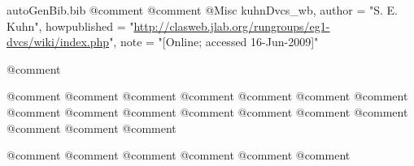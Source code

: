 \begin{filecontents*}{autoGenBib.bib}
@comment %
@comment %
@Misc{ kuhnDvcs_wb,
  author = "S. E. Kuhn",
  howpublished = "\url{http://clasweb.jlab.org/rungroups/eg1-dvcs/wiki/index.php}", 
  note = "[Online; accessed 16-Jun-2009]"
} 

@comment %

@comment %
@comment %
@comment %
@comment %
@comment %
@comment %
@comment %
@comment %
@comment %
@comment %
@comment %
@comment %
@comment %
@comment %
@comment %
@comment %
@comment %



@comment %
@comment %
@comment %
@comment %
@comment %
@comment %


\end{filecontents*}
